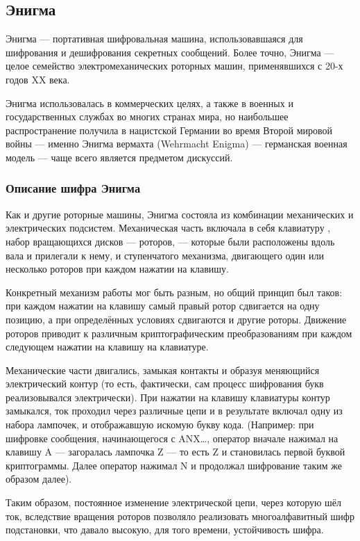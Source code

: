 \subsection{Энигма}

Энигма — портативная шифровальная машина, использовавшаяся для шифрования 
и дешифрования секретных сообщений. Более точно, Энигма — целое семейство 
электромеханических роторных машин, применявшихся с 20-х годов XX 
века.

Энигма использовалась в коммерческих целях, а также в военных и государственных 
службах во многих странах мира, но наибольшее распространение получила 
в нацистской Германии во время Второй мировой войны — именно Энигма 
вермахта (Wehrmacht Enigma) — германская военная модель — чаще всего 
является предметом дискуссий.

\subsubsection{Описание шифра Энигма}

Как и другие роторные машины, Энигма состояла из комбинации механических 
и электрических подсистем. Механическая часть включала в себя клавиатуру
, набор вращающихся дисков — роторов, — которые были расположены вдоль 
вала и прилегали к нему, и ступенчатого механизма, двигающего один 
или несколько роторов при каждом нажатии на клавишу.

Конкретный механизм работы мог быть разным, но общий принцип был таков: 
при каждом нажатии на клавишу самый правый ротор сдвигается на одну 
позицию, а при определённых условиях сдвигаются и другие роторы. Движение 
роторов приводит к различным криптографическим преобразованиям при 
каждом следующем нажатии на клавишу на клавиатуре.

Механические части двигались, замыкая контакты и образуя меняющийся 
электрический контур (то есть, фактически, сам процесс шифрования 
букв реализовывался электрически). При нажатии на клавишу клавиатуры 
контур замыкался, ток проходил через различные цепи и в результате 
включал одну из набора лампочек, и отображавшую искомую букву кода.
(Например: при шифровке сообщения, начинающегося с ANX…, оператор 
вначале нажимал на клавишу A — загоралась лампочка Z — то есть Z и 
становилась первой буквой криптограммы. Далее оператор нажимал N и 
продолжал шифрование таким же образом далее).

Таким образом, постоянное изменение электрической цепи, через которую 
шёл ток, вследствие вращения роторов позволяло реализовать многоалфавитный 
шифр подстановки, что давало высокую, для того времени, устойчивость шифра.

